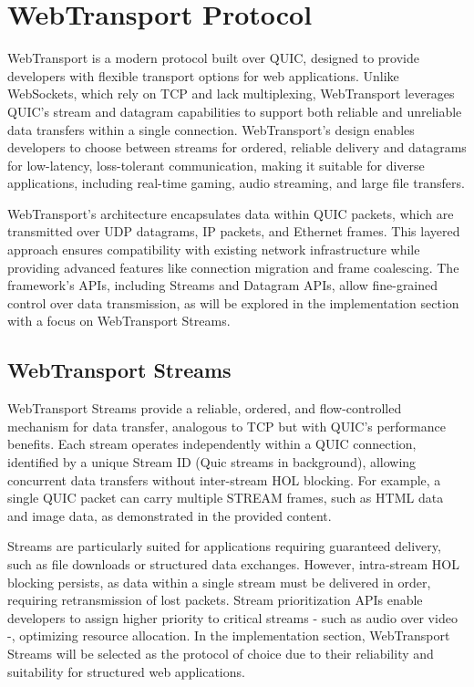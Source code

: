 \section{WebTransport Protocol}

WebTransport is a modern protocol built over QUIC, designed to provide developers with flexible transport options for web applications. Unlike WebSockets, which rely on TCP and lack multiplexing, WebTransport leverages QUIC’s stream and datagram capabilities to support both reliable and unreliable data transfers within a single connection. WebTransport’s design enables developers to choose between streams for ordered, reliable delivery and datagrams for low-latency, loss-tolerant communication, making it suitable for diverse applications, including real-time gaming, audio streaming, and large file transfers.

WebTransport’s architecture encapsulates data within QUIC packets, which are transmitted over UDP datagrams, IP packets, and Ethernet frames. This layered approach ensures compatibility with existing network infrastructure while providing advanced features like connection migration and frame coalescing. The framework’s APIs, including Streams and Datagram APIs, allow fine-grained control over data transmission, as will be explored in the implementation section with a focus on WebTransport Streams.

\subsection{WebTransport Streams}

WebTransport Streams provide a reliable, ordered, and flow-controlled mechanism for data transfer, analogous to TCP but with QUIC’s performance benefits. Each stream operates independently within a QUIC connection, identified by a unique Stream ID (Quic streams in background), allowing concurrent data transfers without inter-stream HOL blocking. For example, a single QUIC packet can carry multiple STREAM frames, such as HTML data and image data, as demonstrated in the provided content.

Streams are particularly suited for applications requiring guaranteed delivery, such as file downloads or structured data exchanges. However, intra-stream HOL blocking persists, as data within a single stream must be delivered in order, requiring retransmission of lost packets. Stream prioritization APIs enable developers to assign higher priority to critical streams - such as audio over video -, optimizing resource allocation. In the implementation section, WebTransport Streams will be selected as the protocol of choice due to their reliability and suitability for structured web applications.

